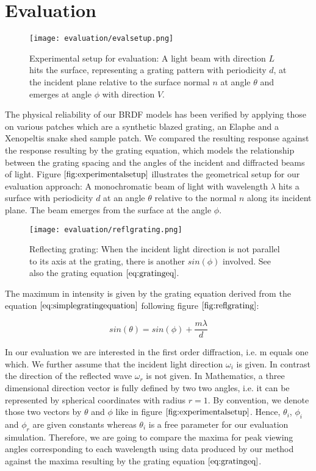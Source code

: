 \section{Evaluation}
\begin{figure}[H]
  \centering
  \texttt{[image: evaluation/evalsetup.png]}
  \caption{Experimental setup for evaluation: A light beam with direction $L$ hits the surface, representing a grating pattern with periodicity $d$, at the incident plane relative to the surface normal $n$ at angle $\theta$ and emerges at angle $\phi$ with direction $V$.}
  \label{fig:experimentalsetup}
\end{figure}

The physical reliability of our BRDF models has been verified by applying those on various patches which are a synthetic blazed grating, an Elaphe and a Xenopeltis snake shed sample patch. We compared the resulting response against the response resulting by the grating equation, which models the relationship between the grating spacing and the angles of the incident and diffracted beams of light. Figure $\ref{fig:experimentalsetup}$ illustrates the geometrical setup for our evaluation approach: A monochromatic beam of light with wavelength $\lambda$ hits a surface with periodicity $d$ at an angle $\theta$ relative to the normal $n$ along its incident plane. The beam emerges from the surface at the angle $\phi$. 

\begin{figure}[H]
  \centering
  \texttt{[image: evaluation/reflgrating.png]}
  \caption{Reflecting grating: When the incident light direction is not parallel to its axis at the grating, there is another $sin(\phi)$ involved. See also the grating equation $\ref{eq:gratingeq}$.}
  \label{fig:reflgrating}
\end{figure}

The maximum in intensity is given by the grating equation derived from the equation $\ref{eq:simplegratingequation}$ following figure $\ref{fig:reflgrating}$: 

\begin{equation}
  sin(\theta) = sin(\phi) + \frac{m \lambda}{d}
\label{eq:gratingeq}
\end{equation}

In our evaluation we are interested in the first order diffraction, i.e. m equals one which. We further assume that the incident light direction $\omega_i$ is given. In contrast the direction of the reflected wave $\omega_r$ is not given.
In Mathematics, a three dimensional direction vector is fully defined by two two angles, i.e. it can be represented by spherical coordinates with radius $r = 1$. By convention, we denote those two vectors by $\theta$ and $\phi$ like in figure $\ref{fig:experimentalsetup}$. Hence, $\theta_i$, $\phi_i$ and $\phi_r$ are given constants whereas $\theta_i$ is a free parameter for our evaluation simulation. Therefore, we are going to compare the maxima for peak viewing angles corresponding to each wavelength using data produced by our method against the maxima resulting by the grating equation $\ref{eq:gratingeq}$.

